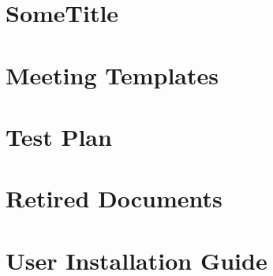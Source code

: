 \documentclass{article}
\begin{document}
\renewcommand{\thepage}{\roman{page}}




\newpage


\newpage
\setcounter{page}{1}
\renewcommand{\thepage}{\arabic{page}}

\newpage


\newpage


\newpage


\newpage


\newpage


\newpage


\newpage


\newpage


\newpage


\newpage


\newpage


\appendix

\newpage
\section{SomeTitle}



\newpage


\newpage
\section{Meeting Templates}

\newpage


\newpage
\section{Test Plan}

\newpage


\newpage
\section{Retired Documents}

\newpage


\newpage


\newpage


\newpage
\section{User Installation Guide}

\newpage

\end{document}
